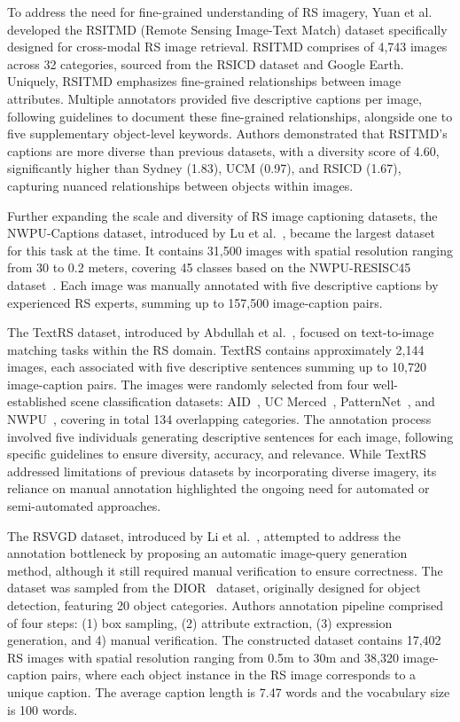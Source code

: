 To address the need for fine-grained understanding of RS imagery, Yuan et al.~\cite{yuan2022exploring} developed the RSITMD (Remote Sensing Image-Text Match) dataset specifically designed for cross-modal RS image retrieval. RSITMD comprises of 4,743 images across 32 categories, sourced from the RSICD dataset and Google Earth. Uniquely, RSITMD emphasizes fine-grained relationships between image attributes. Multiple annotators provided five descriptive captions per image, following guidelines to document these fine-grained relationships, alongside one to five supplementary object-level keywords. Authors demonstrated that RSITMD's captions are more diverse than previous datasets, with a diversity score of 4.60, significantly higher than Sydney (1.83), UCM (0.97), and RSICD (1.67), capturing nuanced relationships between objects within images. 

Further expanding the scale and diversity of RS image captioning datasets, the NWPU-Captions dataset, introduced by Lu et al.~\cite{cheng2022nwpu}, became the largest dataset for this task at the time. It contains 31,500 images with spatial resolution ranging from 30 to 0.2 meters, covering 45 classes based on the NWPU-RESISC45 dataset~\cite{cheng2017remote}. Each image was manually annotated with five descriptive captions by experienced RS experts, summing up to 157,500 image-caption pairs.

The TextRS dataset, introduced by Abdullah et al.~\cite{abdullah2020textrs}, focused on text-to-image matching tasks within the RS domain. TextRS contains approximately 2,144 images, each associated with five descriptive sentences summing up to 10,720 image-caption pairs. The images were randomly selected from four well-established scene classification datasets: AID~\cite{xia2017aid}, UC Merced~\cite{yang2010bag}, PatternNet~\cite{zhou2018patternnet}, and NWPU~\cite{cheng2022nwpu}, covering in total 134 overlapping categories. The annotation process involved five individuals generating descriptive sentences for each image, following specific guidelines to ensure diversity, accuracy, and relevance. While TextRS addressed limitations of previous datasets by incorporating diverse imagery, its reliance on manual annotation highlighted the ongoing need for automated or semi-automated approaches.

The RSVGD dataset, introduced by Li et al.~\cite{zhan2023rsvg}, attempted to address the annotation bottleneck by proposing an automatic image-query generation method, although it still required manual verification to ensure correctness. The dataset was sampled from the DIOR~\cite{li2020object} dataset, originally designed for object detection, featuring 20 object categories. Authors annotation pipeline comprised of four steps: (1) box sampling, (2) attribute extraction, (3) expression generation, and 4) manual verification. The constructed dataset contains 17,402 RS images with spatial resolution ranging from 0.5m to 30m and 38,320 image-caption pairs, where each object instance in the RS image corresponds to a unique caption. The average caption length is 7.47 words and the vocabulary size is 100 words.


